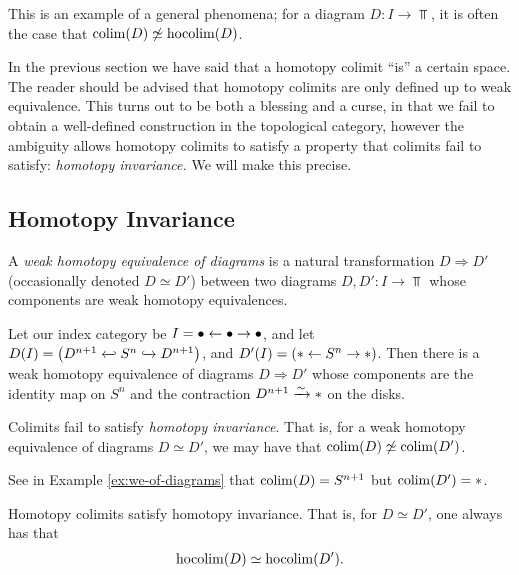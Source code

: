 This is an example of a general phenomena; for a diagram $D: I \to \Top$, it is often the case that $\mathop{\operatorname*{colim}}(D) \not\simeq \mathop{\operatorname*{hocolim}}(D)$.


\begin{remark} In the previous section we have said that a homotopy colimit ``is'' a certain space. The reader should be advised that homotopy colimits are only defined up to weak equivalence. This turns out to be both a blessing and a curse, in that we fail to obtain a well-defined construction in the topological category, however the ambiguity allows homotopy colimits to satisfy a property that colimits fail to satisfy: \textit{homotopy invariance.} We will make this precise.
\end{remark}

\subsection{Homotopy Invariance}

\begin{definition} A \textit{weak homotopy equivalence of diagrams} is a natural transformation $D \Rightarrow D'$ (occasionally denoted $D \simeq D'$) between two diagrams $D,D' : I \to \Top$ whose components are weak homotopy equivalences.
\end{definition}

\begin{example}\label{ex:we-of-diagrams} Let our index category be $I = \bullet \leftarrow \bullet \to \bullet$, and let $D(I) = \left(D^{n+1} \hookfrom S^n \hookto D^{n+1}\right)$, and $D'(I) = \left(\ast \leftarrow S^n \to \ast \right)$. Then there is a weak homotopy equivalence of diagrams $D \Rightarrow D'$ whose components are the identity map on $S^n$ and the contraction $D^{n+1} \xrightarrow{\sim} \ast$ on the disks.
\end{example}

\begin{remark} Colimits fail to satisfy \textit{homotopy invariance}. That is, for a weak homotopy equivalence of diagrams $D\simeq D'$, we may have that $\mathop{\operatorname*{colim}}(D) \not\simeq \mathop{\operatorname*{colim}}(D')$.
\end{remark}

\begin{exercise} See in Example \ref{ex:we-of-diagrams} that $\mathop{\operatorname*{colim}}(D) = S^{n+1}$ but $\mathop{\operatorname*{colim}}(D') = \ast$.
\end{exercise}

\begin{theorem} Homotopy colimits satisfy homotopy invariance. That is, for $D\simeq D'$, one always has that
\begin{align*}
    \mathop{\operatorname*{hocolim}}(D) \simeq \mathop{\operatorname*{hocolim}}(D').
\end{align*}
\end{theorem}

